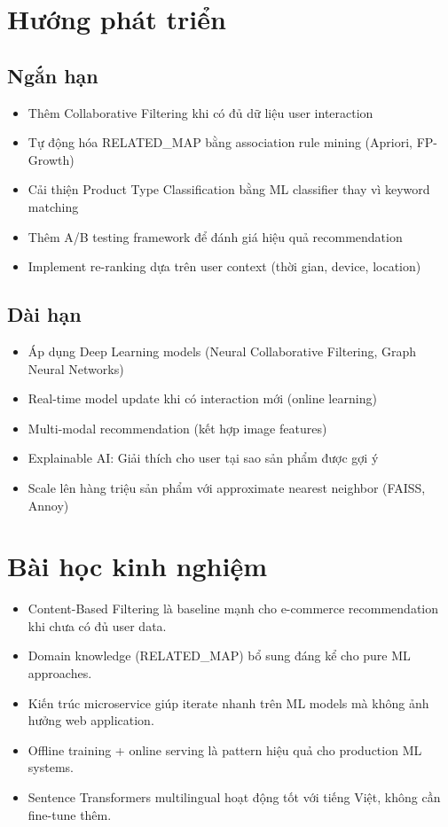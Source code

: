 \documentclass[12pt,a4paper]{report}
\begin{document}
\section{Hướng phát triển}

\subsection{Ngắn hạn}

\begin{itemize}
    \item Thêm Collaborative Filtering khi có đủ dữ liệu user interaction
    \item Tự động hóa RELATED\_MAP bằng association rule mining (Apriori, FP-Growth)
    \item Cải thiện Product Type Classification bằng ML classifier thay vì keyword matching
    \item Thêm A/B testing framework để đánh giá hiệu quả recommendation
    \item Implement re-ranking dựa trên user context (thời gian, device, location)
\end{itemize}

\subsection{Dài hạn}

\begin{itemize}
    \item Áp dụng Deep Learning models (Neural Collaborative Filtering, Graph Neural Networks)
    \item Real-time model update khi có interaction mới (online learning)
    \item Multi-modal recommendation (kết hợp image features)
    \item Explainable AI: Giải thích cho user tại sao sản phẩm được gợi ý
    \item Scale lên hàng triệu sản phẩm với approximate nearest neighbor (FAISS, Annoy)
\end{itemize}

\section{Bài học kinh nghiệm}

\begin{itemize}
    \item Content-Based Filtering là baseline mạnh cho e-commerce recommendation khi chưa có đủ user data.
    \item Domain knowledge (RELATED\_MAP) bổ sung đáng kể cho pure ML approaches.
    \item Kiến trúc microservice giúp iterate nhanh trên ML models mà không ảnh hưởng web application.
    \item Offline training + online serving là pattern hiệu quả cho production ML systems.
    \item Sentence Transformers multilingual hoạt động tốt với tiếng Việt, không cần fine-tune thêm.
\end{itemize}
\end{document}
